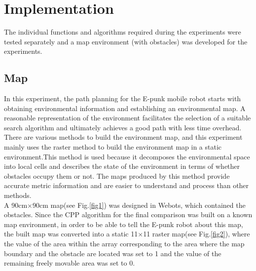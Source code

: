 \documentclass[conference]{IEEEtran}
\begin{document}
\section{Implementation}
The individual functions and algorithms required during the experiments were tested separately and a map environment (with obstacles) was developed for the experiments.
\subsection{Map}
In this experiment, the path planning for the E-punk mobile robot starts with obtaining environmental information and establishing an environmental map. A reasonable representation of the environment facilitates the selection of a suitable search algorithm and ultimately achieves a good path with less time overhead. There are various methods to build the environment map, and this experiment mainly uses the raster method\cite{moravec1985high} to build the environment map in a static environment.This method is used because it decomposes the environmental space into local cells and describes the state of the environment in terms of whether obstacles occupy them or not. The maps produced by this method provide accurate metric information and are easier to understand and process than other methods.\\
A 90cm$\times$90cm map(see Fig.\ref{fig1}) was designed in Webots, which contained the obstacles. Since the CPP algorithm for the final comparison was built on a known map environment, in order to be able to tell the E-punk robot about this map, the built map was converted into a static  11$\times$11 raster map(see Fig.\ref{fig2}), where the value of the area within the array corresponding to the area where the map boundary and the obstacle are located was set to 1 and the value of the remaining freely movable area was set to 0.
\end{document}
